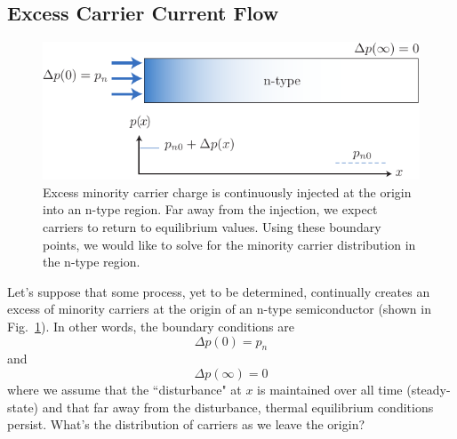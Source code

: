 \subsection{Excess Carrier Current Flow}
\begin{figure}[tb]
\centering
\includegraphics[width=.75\columnwidth]{excess_charge_inject}
\caption{Excess minority carrier charge is continuously injected at the origin into an n-type region.  Far away from the injection, we expect carriers to return to equilibrium values.  Using these boundary points, we would like to solve for the minority carrier distribution in the n-type region.} \label{fig:excess_charge_inject}
\end{figure}
Let's suppose that some process, yet to be determined, continually creates an excess of minority carriers at the origin of an n-type semiconductor (shown in Fig.~\ref{fig:excess_charge_inject}).  In other words, the boundary conditions are
    \begin{equation}
        \Delta p(0) = p_{n}
    \end{equation}	
and
    \begin{equation}
        \Delta p(\infty) = 0
    \end{equation}	
where we assume that the ``disturbance" at $x$ is maintained over all time (steady-state) and that far away from the disturbance, thermal equilibrium conditions persist.  What's the distribution of carriers as we leave the origin?  
